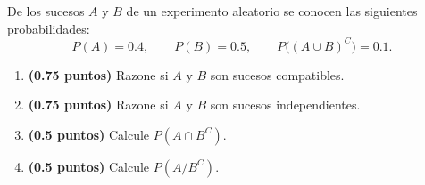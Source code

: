 
De los sucesos $A$ y $B$ de un experimento aleatorio se conocen las siguientes probabilidades:
\[
P(A)=0.4,\qquad P(B)=0.5,\qquad P\bigl((A\cup B)^C\bigr)=0.1.
\]
\begin{enumerate}[label=\alph*)]
\item \textbf{(0.75 puntos)} Razone si $A$ y $B$ son sucesos compatibles.
\item \textbf{(0.75 puntos)} Razone si $A$ y $B$ son sucesos independientes.
\item \textbf{(0.5 puntos)} Calcule $P(A\cap B^C)$.
\item \textbf{(0.5 puntos)} Calcule $P(A/B^C)$.
\end{enumerate}
